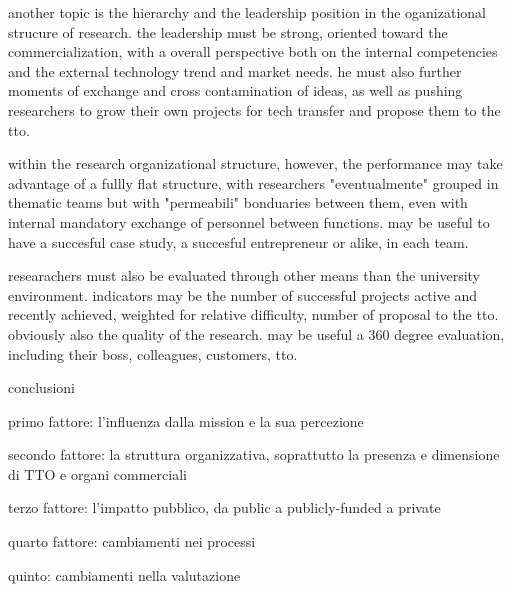another topic is the hierarchy and the leadership position in the oganizational strucure of research. the leadership must be strong, oriented toward the commercialization, with a overall perspective both on the internal competencies and the external technology trend and market needs. he must also further moments of exchange and cross contamination of ideas, as well as pushing researchers to grow their own projects for tech transfer and propose them to the tto.

within the research organizational structure, however, the performance may take advantage of a fullly flat structure, with researchers "eventualmente" grouped in thematic teams but with "permeabili" bonduaries between them, even with internal mandatory exchange of personnel between functions. may be useful to have a succesful case study, a succesful entrepreneur or alike, in each team.

researachers must also be evaluated through other means than the university environment. indicators may be the number of successful projects active and recently achieved, weighted for relative difficulty, number of proposal to the tto. obviously also the quality of the research. may be useful a 360 degree evaluation, including their boss, colleagues, customers, tto. 


conclusioni

primo fattore: l'influenza dalla mission e la sua percezione

secondo fattore: la struttura organizzativa, soprattutto la presenza e dimensione di TTO e organi commerciali

terzo fattore: l'impatto pubblico, da public a publicly-funded a private

quarto fattore: cambiamenti nei processi

quinto: cambiamenti nella valutazione 
